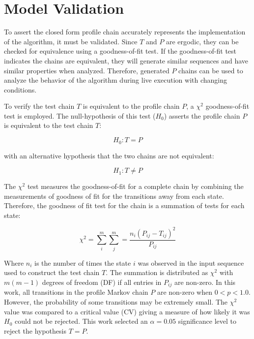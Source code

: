 \section{Model Validation}


To assert the closed form profile chain accurately represents the implementation of the algorithm, it must be validated.
Since $T$ and $P$ are ergodic, they can be checked for equivalence using a goodness-of-fit test.
If the goodness-of-fit test indicates the chains are equivalent, they will generate similar sequences and have similar properties when analyzed.
Therefore, generated $P$ chains can be used to analyze the behavior of the algorithm during live execution with changing conditions.

To verify the test chain $T$ is equivalent to the profile chain $P$, a $\chi^2$ goodness-of-fit test is employed.
The null-hypothesis of this test ($H_{0}$) asserts the profile chain $P$ is equivalent to the test chain $T$:

\begin{equation} H_{0}: T = P \end{equation}

with an alternative hypothesis that the two chains are not equivalent:

\begin{equation} H_{1}: T \neq P \end{equation}

The $\chi^2$ test measures the goodness-of-fit for a complete chain by combining the measurements of goodness of fit for the transitions away from each state.
Therefore, the goodness of fit test for the chain is a summation of tests for each state:\cite{MARKOV3}

\begin{equation} \chi^2 = \sum_{i}^{m} \sum_{j}^{m} = \frac{n_{i}(P_{ij}-T_{ij})^2}{P_{ij}} \end{equation}

Where $n_{i}$ is the number of times the state $i$ was observed in the input sequence used to construct the test chain $T$.
The summation is distributed as $\chi^2$ with $m(m-1)$ degrees of freedom (DF) if all entries in $P_{ij}$ are non-zero.
In this work, all transitions in the profile Markov chain $P$ are non-zero when $0<p<1.0$.
However, the probability of some transitions may be extremely small.
The $\chi^2$ value was compared to a critical value (CV) giving a measure of how likely it was $H_{0}$ could not be rejected.
This work selected an $\alpha = 0.05$ significance level to reject the hypothesis $T=P$.

